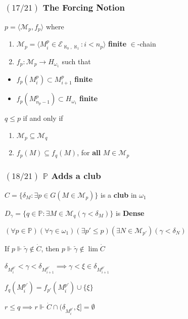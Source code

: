 \documentclass{beamer}
\newcommand{\p}{\mathds{P}}
\newcommand{\op}[2]{\langle #1, #2 \rangle}
\newcommand{\el}[1]{\mathcal{E}_{\aleph_0, #1}}
\begin{document}
\begin{frame}
\frametitle{$(17/21)$ \hspace{20mm} The Forcing Notion}
\begin{definition}
$p=\op{\mathcal{M}_p}{f_p}$ where
\begin{enumerate}
\item
$\mathcal{M}_p= \langle M^p_i \in \el{\aleph_1}: i < n_p  \rangle$ \textbf{finite} $\in$-chain
\item
$f_p: \mathcal{M}_p \longrightarrow H_{\omega_1}$ such that
\end{enumerate}
\begin{itemize}
\item 
$f_p(M^p_i) \subset M^p_{i+1}$ \textbf{finite}
\item 
$f_p(M^p_{n_p-1}) \subset H_{\omega_1}$ \textbf{finite}
\end{itemize}
\end{definition}
\pause
\begin{alertblock}{}
$q \leq p$ if and only if
\begin{enumerate}
\item $\mathcal{M}_p \subseteq \mathcal{M}_q$
\item $f_p(M) \subseteq f_q(M)$, for \textbf{all} $M \in \mathcal{M}_p$
\end{enumerate}
\end{alertblock}
\end{frame}
\begin{frame}
\frametitle{$(18/21)$ \hspace{20mm} $\p$ Adds a club}
\begin{theorem}
$C=\lbrace \delta_M \colon  \exists p \in G(M \in \mathcal{M}_p)\rbrace$ is a \textbf{club} in $\omega_1$
\end{theorem}
\pause
\begin{lemma}
$D_{\gamma}= \{q \in \p \colon \exists M \in \mathcal{M}_q(\gamma < \delta_M)\}$ is \textbf{Dense}
\end{lemma}
\begin{alertblock}{}
$(\forall p \in \p) (\forall\gamma \in \omega_1)(\exists p' \leq p)(\exists N \in \mathcal{M}_{p'})(\gamma < \delta_N)$ 
\end{alertblock}
\pause
\begin{lemma}
If $p \Vdash\check{\gamma} \notin \dot{C}$, then $p \Vdash \check{\gamma} \notin \lim\dot{C}$
\end{lemma}
\begin{alertblock}{}
$\delta_{M^{p'}_i} < \gamma < \delta_{M^{p'}_{i+1}} \implies \gamma < \xi \in \delta_{M^{p'}_{i+1}}$

$f_q(M^{p'}_i)=f_{p'}(M^{p'}_i) \cup \{\xi\}$

$r \leq q \implies r \Vdash \dot{C} \cap (\delta_{M^{p'}_i}, \xi]=\emptyset$
\end{alertblock}
\end{frame}
\end{document}
